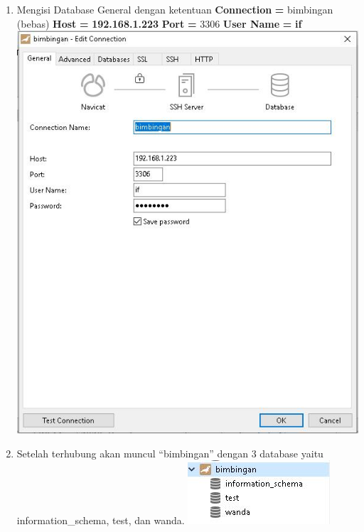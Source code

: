 \documentclass{article}
\begin{document}
\begin{enumerate}
            \newline  
    \item Mengisi Database General dengan ketentuan 
            \textbf{Connection} \textbf{=} bimbingan (bebas) \newline \textbf{Host} \textbf{=} \textbf{192.168.1.223} \newline \textbf{Port} \textbf{=} 3306 \newline \textbf{User Name} \textbf{=} \textbf{if}
            \newline
            \includegraphics[scale=0.4]{28.2.jpg}
            \newline
    \item Setelah terhubung akan muncul “bimbingan” dengan 3 database yaitu information\_schema, test, dan wanda.
	        \newline
	        \includegraphics[scale=0.8]{28.3.jpg}

\end{enumerate}
\end{document}

